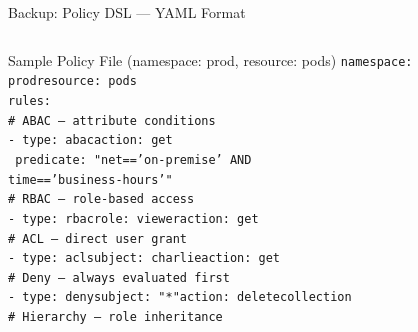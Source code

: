\documentclass[aspectratio=169,10pt]{beamer}
\begin{document}
\begin{frame}[t,noframenumbering]{Backup: Policy DSL --- YAML Format}
\vspace{3pt}
\begin{columns}[T,onlytextwidth]
\begin{column}{0.53\textwidth}
\begin{callout}{Sample Policy File (namespace: prod, resource: pods)}
{\setlength{\parskip}{0pt}\setlength{\baselineskip}{9.5pt}%
\texttt{\tiny namespace: prod\hspace{6pt}resource: pods}\\
\texttt{\tiny rules:}\\
\texttt{\tiny\hspace{5pt}\# ABAC --- attribute conditions}\\
\texttt{\tiny\hspace{5pt}- type: abac\hspace{4pt}action: get}\\
\texttt{\tiny\hspace{7pt}\phantom{-}\,predicate: "net=='on-premise' AND}\\
\texttt{\tiny\hspace{22pt}time=='business-hours'"}\\[2pt]
\texttt{\tiny\hspace{5pt}\# RBAC --- role-based access}\\
\texttt{\tiny\hspace{5pt}- type: rbac\hspace{4pt}role: viewer\hspace{4pt}action: get}\\[2pt]
\texttt{\tiny\hspace{5pt}\# ACL --- direct user grant}\\
\texttt{\tiny\hspace{5pt}- type: acl\hspace{4pt}subject: charlie\hspace{4pt}action: get}\\[2pt]
\texttt{\tiny\hspace{5pt}\# Deny --- always evaluated first}\\
\texttt{\tiny\hspace{5pt}- type: deny\hspace{4pt}subject: "*"\hspace{4pt}action: deletecollection}\\[2pt]
\texttt{\tiny\hspace{5pt}\# Hierarchy --- role inheritance}\\
}
\end{callout}
\end{column}
\end{columns}
\end{frame}
\end{document}
